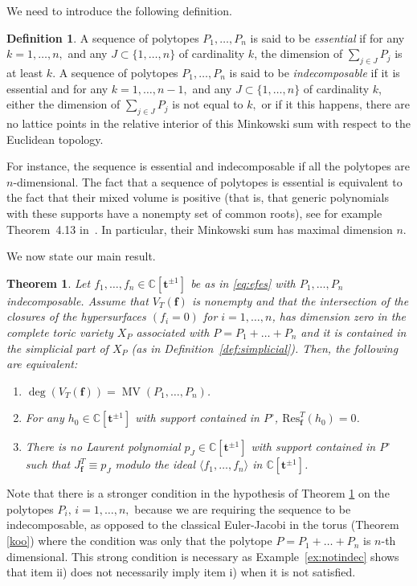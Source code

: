 \documentclass[a4paper,11pt]{amsart}
\newcommand{\MV}{\operatorname{MV}}
\newcommand{\C}{\mathbb{C}}
\newcommand{\bff}{{\boldsymbol{f}}}
\newcommand{\bft}{{\boldsymbol{t}}}
\newcounter{thm}
\numberwithin{thm}{section}
\numberwithin{equation}{section}
\theoremstyle{definition}
\newtheorem{definition}[thm]{Definition}
\theoremstyle{plain}
\newtheorem{theorem}[thm]{Theorem}
\begin{document}
We need to introduce the following definition.
\begin{definition}\label{def:polytopes}
A sequence of polytopes $P_1,\ldots, P_n$ is said to be \textit{essential} if for any $k=1,\ldots, n,$ and any $J\subset\{1,\ldots, n\}$ of cardinality $k$, the dimension of $\sum_{j\in J} P_j$ is at least $k$. 
A sequence of polytopes $P_1,\ldots, P_n$ is said to be \textit{indecomposable} if it is essential and for any $k=1,\ldots, n-1,$ and any $J\subset\{1,\ldots, n\}$ of cardinality $k$,  either the dimension of $\sum_{j\in J} P_j$ is not equal to $k,$ or if it this happens, there are no lattice points in the relative interior of this Minkowski sum with respect to the Euclidean topology.
\end{definition}

 For instance, the sequence is essential and indecomposable if all the polytopes are $n$-dimensional.   The fact that a sequence of polytopes is essential is equivalent to the fact that their mixed volume is positive (that is, that generic polynomials with these supports have a nonempty set of common roots), see for example Theorem~4.13 in~\cite{E96}. In particular, their Minkowski sum has maximal dimension $n$.
 
 
 We now state our main result. 

\begin{theorem}\label{smt}
Let $f_1,\ldots, f_n\in\C[\bft^{\pm1}]$ be as in \eqref{eq:efes} with  $P_1,\ldots, P_n$ indecomposable. Assume that $V_T(\bff)$ is nonempty and that the intersection of the closures of the hypersurfaces $(f_i=0)$ for $i=1,\dots,n$, has dimension zero in  the complete toric variety $X_P$ associated with $P=P_1+\dots +P_n$ and it is contained in the simplicial part of $X_P$ (as in Definition~\ref{def:simplicial}).
Then, the following are equivalent:
\begin{enumerate}
\item[i)] $\deg(V_T(\bff))=\MV(P_1,\ldots, P_n)$.
\item[ii)] For any $ h_0\in\C[\bft^{\pm1}]$ with support contained in $P^\circ$, 
$\mbox{Res}^T_{\bff}(h_0) =0$.
\item[iii)] There is no Laurent polynomial  $p_J\in  \C[\bft^{\pm1}]$ with support contained in $P^\circ$ such that $J^T_\bff\equiv p_J$ modulo the ideal 
$\langle f_1,\ldots, f_n\rangle$ in $\C[\bft^{\pm1}]$. 
\end{enumerate}
\end{theorem}


Note that there is a stronger condition in the hypothesis of Theorem \ref{smt} on the polytopes $P_i,\,i=1,\ldots, n,$ because we are requiring the sequence to be indecomposable, as opposed to the classical Euler-Jacobi in the torus (Theorem \ref{koo}) where the condition was  only  that the polytope  $P = P_1 + \dots + P_n$ is $n$-th dimensional. This strong condition is necessary as Example~\ref{ex:notindec} shows that item ii) does not necessarily imply item i) when it is not satisfied. 
\end{document}
